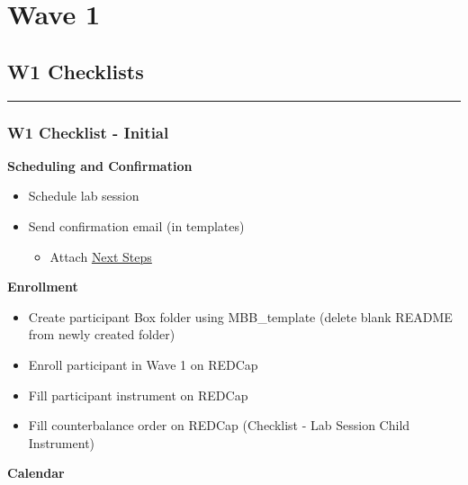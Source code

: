 \documentclass[]{book}
\providecommand{\tightlist}{%
  \setlength{\itemsep}{0pt}\setlength{\parskip}{0pt}}
\begin{document}
\hypertarget{wave-1}{%
\chapter{Wave 1}\label{wave-1}}

\hypertarget{w1-checklists}{%
\section{W1 Checklists}\label{w1-checklists}}

\begin{center}\rule{0.5\linewidth}{0.5pt}\end{center}

\hypertarget{w1-checklist---initial}{%
\subsection{W1 Checklist - Initial}\label{w1-checklist---initial}}

\textbf{Scheduling and Confirmation}

\begin{itemize}
\tightlist
\item
  Schedule lab session
\item
  Send confirmation email (in templates)

  \begin{itemize}
  \tightlist
  \item
    Attach \href{https://app.box.com/file/630326369239}{Next Steps}
  \end{itemize}
\end{itemize}

\textbf{Enrollment}

\begin{itemize}
\tightlist
\item
  Create participant Box folder using MBB\_template (delete blank README from newly created folder)
\item
  Enroll participant in Wave 1 on REDCap
\item
  Fill participant instrument on REDCap
\item
  Fill counterbalance order on REDCap (Checklist - Lab Session Child Instrument)
\end{itemize}

\textbf{Calendar}
\end{document}
